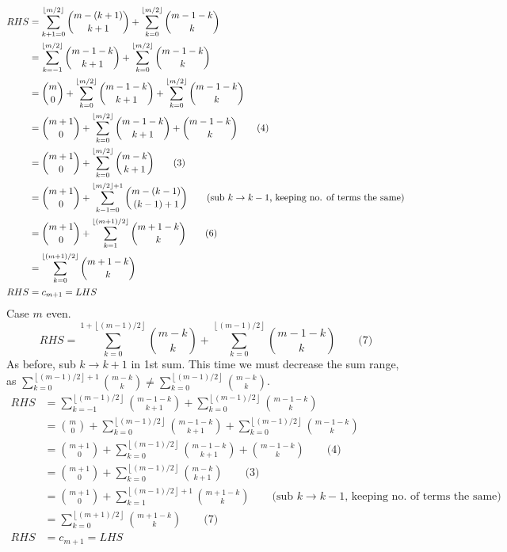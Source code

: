 \documentclass[11pt]{article}
\begin{document}
\begin{align*} 
RHS   &=\sum_{k+1=0}^{\left\lfloor m/2\right\rfloor} {m-\left(k+1\right)\choose k+1}+\sum_{k=0}^{\left\lfloor m/2\right\rfloor} {m-1-k\choose k} \\ 
    &=\sum_{k=-1}^{\left\lfloor m/2\right\rfloor} {m-1-k\choose k+1}+\sum_{k=0}^{\left\lfloor m/2\right\rfloor} {m-1-k\choose k}\\
    &={m \choose 0}+\sum_{k=0}^{\left\lfloor m/2\right\rfloor} {m-1-k\choose k+1}+\sum_{k=0}^{\left\lfloor m/2\right\rfloor} {m-1-k\choose k}\\
    &={m+1 \choose 0}+\sum_{k=0}^{\left\lfloor m/2\right\rfloor} {m-1-k\choose k+1}+{m-1-k\choose k}\qquad\text{(4)}\\
    &={m+1 \choose 0}+\sum_{k=0}^{\left\lfloor m/2\right\rfloor} {m-k\choose k+1}\qquad\text{(3)}\\
    &={m+1 \choose 0}+\sum_{k-1=0}^{\left\lfloor m/2\right\rfloor+1} {m-\left( k-1\right)\choose \left( k-1\right)+1}\qquad\text{(sub $k\rightarrow k-1$, keeping no. of terms the same)}\\
    &={m+1 \choose 0}+\sum_{k=1}^{\left\lfloor \left(m+1\right)/2\right\rfloor} {m+1-k\choose k}\qquad\text({6})\\
    &=\sum_{k=0}^{\left\lfloor \left(m+1\right)/2\right\rfloor} {m+1-k\choose k}\\
RHS &=c_{m+1}=LHS
\end{align*}
Case $m$ even.
$$RHS=\sum_{k=0}^{1+\left\lfloor \left(m-1\right)/2\right\rfloor} {m-k\choose k}+\sum_{k=0}^{\left\lfloor \left(m-1\right)/2\right\rfloor} {m-1-k\choose k}\qquad\text{(7)}$$
As before, sub $k\rightarrow k+1$ in 1st sum. This time we must decrease the sum range, as $\sum_{k=0}^{\left\lfloor \left(m-1\right)/2\right\rfloor+1} {m-k\choose k} \neq \sum_{k=0}^{\left\lfloor \left(m-1\right)/2\right\rfloor} {m-k\choose k}$.
\begin{align*} 
RHS &=\sum_{k=-1}^{\left\lfloor \left(m-1\right)/2\right\rfloor} {m-1-k\choose k+1}+\sum_{k=0}^{\left\lfloor \left(m-1\right)/2\right\rfloor} {m-1-k\choose k}\\
    &={m\choose 0}+\sum_{k=0}^{\left\lfloor \left(m-1\right)/2\right\rfloor} {m-1-k\choose k+1}+\sum_{k=0}^{\left\lfloor \left(m-1\right)/2\right\rfloor} {m-1-k\choose k}\\
    &={m+1\choose 0}+\sum_{k=0}^{\left\lfloor \left(m-1\right)/2\right\rfloor} {m-1-k\choose k+1}+ {m-1-k\choose k}\qquad\text{(4)}\\
    &={m+1\choose 0}+\sum_{k=0}^{\left\lfloor \left(m-1\right)/2\right\rfloor}{m-k\choose k+1}\qquad\text{(3)}\\
    &={m+1\choose 0}+\sum_{k=1}^{\left\lfloor \left(m-1\right)/2\right\rfloor+1}{m+1-k\choose k}\qquad\text{(sub $k\rightarrow k-1$, keeping no. of terms the same)}\\
    &=\sum_{k=0}^{\left\lfloor \left(m+1\right)/2\right\rfloor}{m+1-k\choose k}\qquad{\text{(7)}}\\
RHS &=c_{m+1}=LHS
\end{align*}
\end{document}
